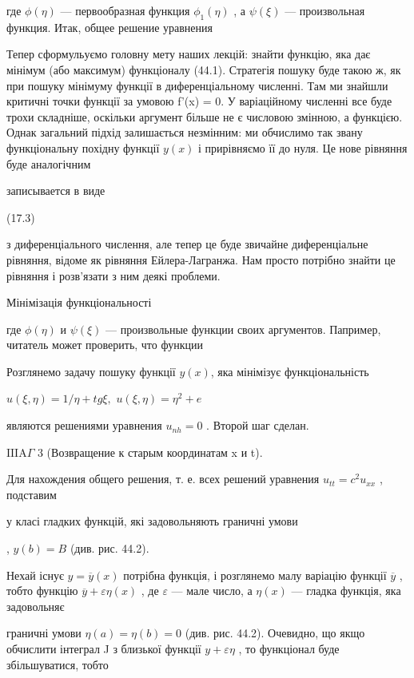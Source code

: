 \documentclass[
  ukrainian,
]{article}
\begin{document}
где \(\phi(\eta)\) --- первообразная функция \(\phi_1(\eta)\) , а
\(\psi(\xi)\) --- произвольная функция. Итак, общее решение уравнения

Тепер сформульуємо головну мету наших лекцій: знайти функцію, яка дає
мінімум (або максимум) функціоналу (44.1). Стратегія пошуку буде такою
ж, як при пошуку мінімуму функції в диференціальному численні. Там ми
знайшли критичні точки функції за умовою f'(x) = 0. У варіаційному
численні все буде трохи складніше, оскільки аргумент більше не є
числовою змінною, а функцією. Однак загальний підхід залишається
незмінним: ми обчислимо так звану функціональну похідну функції \(y(x)\)
і прирівняємо її до нуля. Це нове рівняння буде аналогічним

записывается в виде

(17.3)

з диференціального числення, але тепер це буде звичайне диференціальне
рівняння, відоме як рівняння Ейлера-Лагранжа. Нам просто потрібно знайти
це рівняння і розв'язати з ним деякі проблеми.

Мінімізація функціональності

где \(\phi(\eta)\) и \(\psi(\xi)\) --- произвольные функции своих
аргументов. Папример, читатель может проверить, что функции

Розглянемо задачу пошуку функції \(y(x)\), яка мінімізує
функціональність

\(u(\xi, \eta) = 1/\eta + tg \xi,\) \(u(\xi, \eta) = \eta^2 + e\)

являются решениями уравнения \(u_{\mathrm{ }nh}=0\) . Второй шаг сделан.

\(\text{IIIA}\Gamma\) 3 (Возвращение к старым координатам x и t).

Для нахождения общего решения, т. е. всех решений уравнения
\(u_{tt} = c^2 u_{xx}\) , подставим

у класі гладких функцій, які задовольняють граничні умови

, \(y(b) = B\) (див. рис. 44.2).

Нехай існує \(y = \overline{y}(x)\) потрібна функція, і розглянемо малу
варіацію функції \(\overline{y}\) , тобто функцію
\(\overline{y} + \varepsilon \eta(x)\) , де \(\varepsilon\) --- мале
число, а \(\eta(x)\) --- гладка функція, яка задовольняє

граничні умови \(\eta(a) = \eta(b) = 0\) (див. рис. 44.2). Очевидно, що
якщо обчислити інтеграл J з близької функції \(y + \varepsilon \eta\) ,
то функціонал буде збільшуватися, тобто
\end{document}
